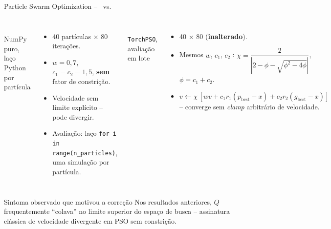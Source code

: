 \begin{frame}{Particle Swarm Optimization -- \antes\ vs. \depois}
  \begin{columns}[T,onlytextwidth]
      \antes\\[0.3em]
      \small NumPy puro, laço Python por partícula
      \begin{itemize}\footnotesize
        \item 40 partículas $\times$ 80 iterações.
        \item $w=0{,}7$, $c_1=c_2=1{,}5$, \textbf{sem} fator de constrição.
        \item Velocidade sem limite explícito -- pode divergir.
        \item Avaliação: laço \texttt{for i in range(n\_particles)}, uma
          simulação por partícula.
      \end{itemize}
      \depois\\[0.3em]
      \small \texttt{TorchPSO}, avaliação em lote
      \begin{itemize}\footnotesize
        \item 40 $\times$ 80 (\textbf{inalterado}).
        \item Mesmos $w$, $c_1$, $c_2$ :
          $\chi = \dfrac{2}{|2-\phi-\sqrt{\phi^2-4\phi}|}$, $\phi=c_1{+}c_2$.
        \item $v \leftarrow \chi\,[w v + c_1 r_1(p_{\text{best}}{-}x) +
          c_2 r_2(g_{\text{best}}{-}x)]$ -- converge sem \textit{clamp}
          arbitrário de velocidade.
      \end{itemize}
  \end{columns}
  \vspace{0.8em}

  \begin{alertblock}{Sintoma observado que motivou a correção}
    \small Nos resultados anteriores, $Q$ frequentemente ``colava'' no
    limite superior do espaço de busca -- assinatura clássica de
    velocidade divergente em PSO sem constrição.
  \end{alertblock}

\end{frame}
